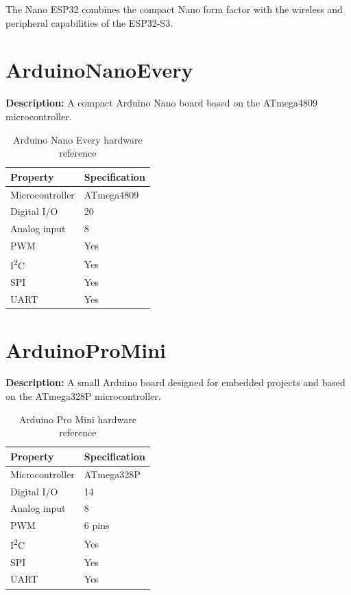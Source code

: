 The Nano ESP32 combines the compact Nano form factor with the wireless and
peripheral capabilities of the ESP32-S3.

\section{ArduinoNanoEvery}

\textbf{Description:} A compact Arduino Nano board based on the ATmega4809
microcontroller.

\begin{table}[H]
\centering
\caption{Arduino Nano Every hardware reference}
\label{tab:board-nano-every}
\begin{tabular}{ll}
\toprule
\textbf{Property} & \textbf{Specification} \\
\midrule
Microcontroller & ATmega4809 \\
Digital I/O & 20 \\
Analog input & 8 \\
PWM & Yes \\
I\textsuperscript{2}C & Yes \\
SPI & Yes \\
UART & Yes \\
\bottomrule
\end{tabular}
\end{table}

\section{ArduinoProMini}

\textbf{Description:} A small Arduino board designed for embedded projects
and based on the ATmega328P microcontroller.

\begin{table}[H]
\centering
\caption{Arduino Pro Mini hardware reference}
\label{tab:board-pro-mini}
\begin{tabular}{ll}
\toprule
\textbf{Property} & \textbf{Specification} \\
\midrule
Microcontroller & ATmega328P \\
Digital I/O & 14 \\
Analog input & 8 \\
PWM & 6 pins \\
I\textsuperscript{2}C & Yes \\
SPI & Yes \\
UART & Yes \\
\bottomrule
\end{tabular}
\end{table}

